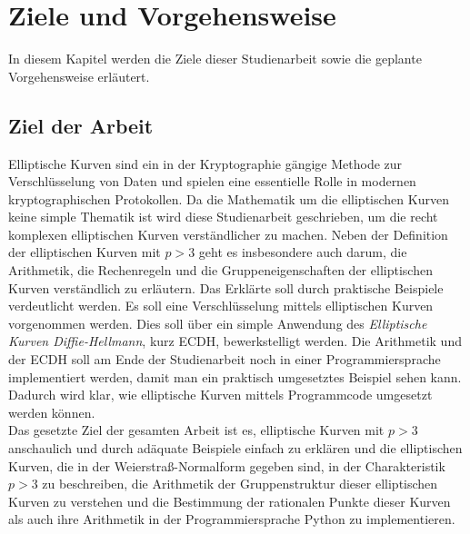 \chapter{Ziele und Vorgehensweise}
In diesem Kapitel werden die Ziele dieser Studienarbeit sowie die geplante Vorgehensweise erläutert.

\section{Ziel der Arbeit}
Elliptische Kurven sind ein in der Kryptographie gängige Methode zur Verschlüsselung von Daten und spielen eine essentielle Rolle in modernen kryptographischen Protokollen. Da die Mathematik um die elliptischen Kurven keine simple Thematik ist wird diese Studienarbeit geschrieben, um die recht komplexen elliptischen Kurven verständlicher zu machen. Neben der Definition der elliptischen Kurven mit $p > 3$ geht es insbesondere auch darum, die Arithmetik, die Rechenregeln und die Gruppeneigenschaften der elliptischen Kurven verständlich zu erläutern. Das Erklärte soll durch praktische Beispiele verdeutlicht werden. Es soll eine Verschlüsselung mittels elliptischen Kurven vorgenommen werden. Dies soll über ein simple Anwendung des \textit{Elliptische Kurven Diffie-Hellmann}, kurz ECDH, bewerkstelligt werden. Die Arithmetik und der ECDH soll am Ende der Studienarbeit noch in einer Programmiersprache implementiert werden, damit man ein praktisch umgesetztes Beispiel sehen kann. Dadurch wird klar, wie elliptische Kurven mittels Programmcode umgesetzt werden können.\\

Das gesetzte Ziel der gesamten Arbeit ist es, elliptische Kurven mit $p > 3$ anschaulich und durch adäquate Beispiele einfach zu erklären und die elliptischen Kurven, die in der Weierstraß-Normalform gegeben sind, in der Charakteristik $p > 3$ zu beschreiben, die Arithmetik der Gruppenstruktur dieser elliptischen Kurven zu verstehen und die Bestimmung der rationalen Punkte dieser Kurven als auch ihre Arithmetik in der Programmiersprache Python zu implementieren.

